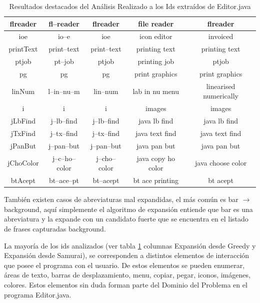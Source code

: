 \begin{table}
\begin{tabular}{| c | c | c | c | c |}
flreader&fl--reader&flreader&file reader&flreader\\ \hline
ioe&io--e&ioe&icon editor&invoiced\\ \hline
printText&print--text&print--text&printing text&printing text\\ \hline
ptjob&pt--job&ptjob&printing job&ptjob\\ \hline
pg&pg&pg&print graphics&print graphics\\ \hline
linNum&l--in--nu--m&lin--num&lab in nu menu&linearised numerically\\ \hline
i&i&i&images&images\\ \hline
jLbFind&j--lb--find&j--lb--find&java lb find&java lb find\\ \hline
jTxFind&j--tx--find&j--tx--find&java text find&java text find\\ \hline
jPanBut&j--pan--but&j--pan--but&java pan but&java pan but\\ \hline
jChoColor&j--c--ho--color&j--cho--color&java copy ho color&java choose color\\ \hline
btAcept&bt--ace--pt&bt--acept&bt ace printing&bt acept\\ \hline

  \end{tabular}
	 
   \caption{Resultados destacados del Análisis Realizado a los Ids extraídos de Editor.java}
   \label{tabla6}
     
\end{table}

\clearpage %

También existen casos de abreviaturas mal expandidas, el más común es \textsf{bar} $\rightarrow$ \textsf{background}, aquí simplemente el algoritmo de expansión entiende que \textsf{bar} es una abreviatura y la expande con un candidato fuerte que se encuentra en el listado de frases capturadas \textsf{background}.

La mayoría de los ids analizados (ver tabla \ref{tabla6} columnas Expansión desde Greedy y Expansión desde Samurai), se corresponden a distintos elementos de interacción que posee el programa con el usuario. De estos elementos se pueden enumerar, áreas de texto, barras de desplazamiento, menu, copiar, pegar, iconos, imágenes, colores. Estos elementos sin duda forman parte del Dominio del Problema en el programa Editor.java.



